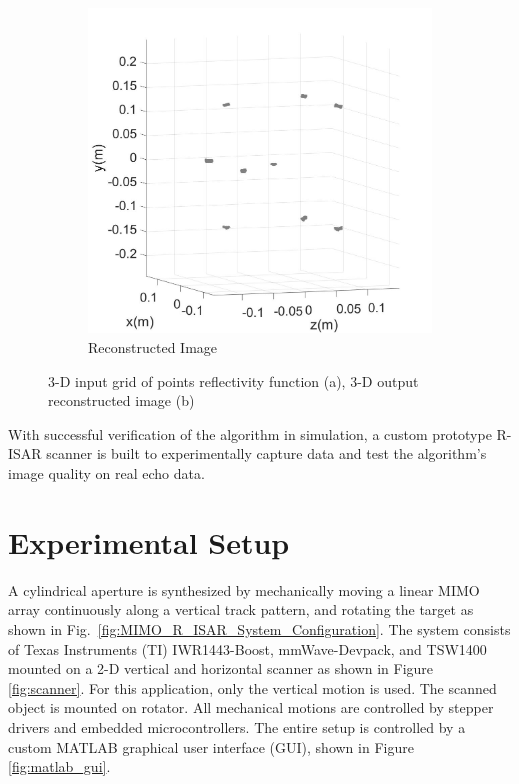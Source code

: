 \documentclass[conference]{IEEEtran}
\begin{document}
\begin{figure} [h]
\begin{subfigure}{.5\linewidth}
				\includegraphics[width=1\linewidth]{../MatlabResults/CSAR_Grid3D_output}
				\caption{Reconstructed Image}
			\end{subfigure}
			\caption{3-D input grid of points reflectivity function (a), 3-D output reconstructed image (b)}
		\end{figure}
	
		With successful verification of the algorithm in simulation, a custom prototype R-ISAR scanner is built to experimentally capture data and test the algorithm's image quality on real echo data.
		
		\section{Experimental Setup}
		\label{sec:experimental_setup}
		
		A cylindrical aperture is synthesized by mechanically moving a linear MIMO array continuously along a vertical track pattern, and rotating the target as shown in Fig.~\ref{fig:MIMO_R_ISAR_System_Configuration}. The system consists of Texas Instruments (TI) IWR1443-Boost, mmWave-Devpack, and TSW1400 \cite{TI:mmWave} mounted on a 2-D vertical and horizontal scanner as shown in Figure \ref{fig:scanner}. For this application, only the vertical motion is used. The scanned object is mounted on rotator. All mechanical motions are controlled by stepper drivers and embedded microcontrollers. The entire setup is controlled by a custom MATLAB graphical user interface (GUI), shown in Figure \ref{fig:matlab_gui}. 
		
\end{document}
